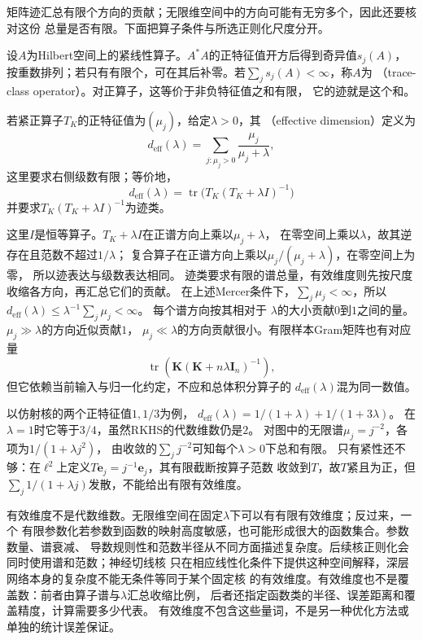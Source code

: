 矩阵迹汇总有限个方向的贡献；无限维空间中的方向可能有无穷多个，因此还要核对这份
总量是否有限。下面把算子条件与所选正则化尺度分开。
\begin{definition}[迹类条件与有效维度]
\label{def:functional-trace-effective-dimension}
设$A$为Hilbert空间上的紧线性算子。$A^*A$的正特征值开方后得到奇异值$s_j(A)$，
按重数排列；若只有有限个，可在其后补零。若$\sum_j s_j(A)<\infty$，称$A$为
（trace-class operator）。对正算子，这等价于非负特征值之和有限，
它的迹就是这个和。

若紧正算子$T_K$的正特征值为$(\mu_j)$，给定$\lambda>0$，其
（effective dimension）定义为
\begin{equation}
  d_{\mathrm{eff}}(\lambda)
  =
  \sum_{j:\mu_j>0}\frac{\mu_j}{\mu_j+\lambda},
  \label{eq:functional-effective-dimension}
\end{equation}
这里要求右侧级数有限；等价地，
\[
  d_{\mathrm{eff}}(\lambda)
  =
  \operatorname{tr}\bigl(T_K(T_K+\lambda I)^{-1}\bigr)
\]
并要求$T_K(T_K+\lambda I)^{-1}$为迹类。
\end{definition}
这里$I$是恒等算子。$T_K+\lambda I$在正谱方向上乘以$\mu_j+\lambda$，
在零空间上乘以$\lambda$，故其逆存在且范数不超过$1/\lambda$；
复合算子在正谱方向上乘以$\mu_j/(\mu_j+\lambda)$，在零空间上为零，
所以迹表达与级数表达相同。
迹类要求有限的谱总量，有效维度则先按尺度收缩各方向，再汇总它们的贡献。
在上述Mercer条件下，$\sum_j\mu_j<\infty$，所以
$d_{\mathrm{eff}}(\lambda)\leq\lambda^{-1}\sum_j\mu_j<\infty$。
每个谱方向按其相对于
$\lambda$的大小贡献$0$到$1$之间的量。$\mu_j\gg\lambda$的方向近似贡献$1$，
$\mu_j\ll\lambda$的方向贡献很小。有限样本Gram矩阵也有对应量
\[
  \operatorname{tr}\left(
    \bm{K}(\bm{K}+n\lambda\bm{I}_n)^{-1}
  \right),
\]
但它依赖当前输入与归一化约定，不应和总体积分算子的
$d_{\mathrm{eff}}(\lambda)$混为同一数值。

以仿射核的两个正特征值$1,1/3$为例，
$d_{\mathrm{eff}}(\lambda)=1/(1+\lambda)+1/(1+3\lambda)$。
在$\lambda=1$时它等于$3/4$，虽然RKHS的代数维数仍是$2$。
对图中的无限谱$\mu_j=j^{-2}$，各项为$1/(1+\lambda j^2)$，
由收敛的$\sum_j j^{-2}$可知每个$\lambda>0$下总和有限。
只有紧性还不够：在$\ell^2$上定义$T\bm e_j=j^{-1}\bm e_j$，其有限截断按算子范数
收敛到$T$，故$T$紧且为正，但$\sum_j1/(1+\lambda j)$发散，不能给出有限有效维度。

有效维度不是代数维数。无限维空间在固定$\lambda$下可以有有限有效维度；反过来，一个
有限参数化若参数到函数的映射高度敏感，也可能形成很大的函数集合。参数数量、谱衰减、
导数规则性和范数半径从不同方面描述复杂度。后续核正则化会同时使用谱和范数；神经切线核
只在相应线性化条件下提供这种空间解释，深层网络本身的复杂度不能无条件等同于某个固定核
的有效维度。有效维度也不是覆盖数：前者由算子谱与$\lambda$汇总收缩比例，
后者还指定函数类的半径、误差距离和覆盖精度，计算需要多少代表。
有效维度不包含这些量词，不是另一种优化方法或单独的统计误差保证。

